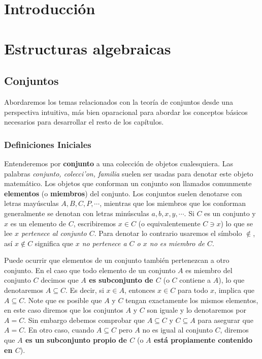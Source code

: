\documentclass[12pt,]{krantz}
\theoremstyle{definition}
\theoremstyle{definition}
\theoremstyle{definition}
\theoremstyle{remark}
\begin{document}
\chapter{Introducción}\label{introduccion}

\chapter{Estructuras algebraicas}\label{estructuras-algebraicas}

\section{Conjuntos}\label{conjuntos}

Abordaremos los temas relacionados con la teoría de conjuntos desde una
perspectiva intuitiva, más bien oparacional para abordar los conceptos
básicos necesarios para desarrollar el resto de los capítulos.

\subsection{Definiciones Iniciales}\label{definiciones-iniciales}

Entenderemos por \textbf{conjunto} a una colección de objetos
cualesquiera. Las palabras \emph{conjunto, colecci'on, familia} suelen
ser usadas para denotar este objeto matemático. Los objetos que
conforman un conjunto son llamados comunmente \textbf{elementos} (o
\textbf{miembros}) del conjunto. Los conjuntos suelen denotarse con
letras mayúsculas \(A, B, C, P,\cdots\), mientras que los miembros que
los conforman generalmente se denotan con letras minúsculas
\(a,b, x, y,\cdots\). Si \(C\) es un conjunto y \(x\) es un elemento de
\(C\), escribiremos \(x\in C\) (o equivalentemente \(C\ni x\)) lo que se
lee \emph{\(x\) pertenece al conjunto \(C\)}. Para denotar lo contrario
usaremos el símbolo \(\notin\), así \(x\notin C\) significa que
\emph{\(x\) no pertenece a \(C\) o \(x\) no es miembro de \(C\)}.

\smallskip

Puede ocurrir que elementos de un conjunto también pertenezcan a otro
conjunto. En el caso que todo elemento de un conjunto \(A\) es miembro
del conjunto \(C\) decimos que \textbf{\(A\) es subconjunto de \(C\)} (o
\(C\) contiene a \(A\)), lo que denotaremos \(A\subseteq C\). Es decir,
si \(x\in A\), entonces \(x\in C\) para todo \(x\), implica que
\(A\subseteq C\). Note que es posible que \(A\) y \(C\) tengan
exactamente los mismos elementos, en este caso diremos que los conjuntos
\(A\) y \(C\) son iguale y lo denotaremos por \(A=C\). Sin embargo
debemos comprobar que \(A\subseteq C\) y \(C\subseteq A\) para asegurar
que \(A=C\). En otro caso, cuando \(A\subseteq C\) pero \(A\) no es
igual al conjunto \(C\), diremos que \textbf{\(A\) es un subconjunto
propio de \(C\)} (o \textbf{\(A\) está propiamente contenido en \(C\)}).
\end{document}
